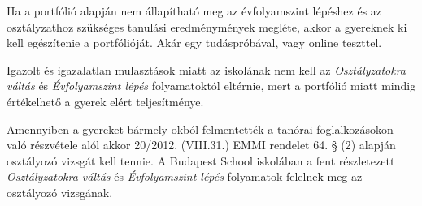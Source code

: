 Ha a portfólió alapján nem állapítható meg az évfolyamszint lépéshez és az
osztályzathoz
szükséges tanulási eredménymények megléte, akkor a gyereknek ki kell
egészítenie a portfólióját. Akár egy tudáspróbával, vagy online teszttel.

Igazolt és igazalatlan mulasztások miatt az iskolának nem kell az
\emph{Osztályzatokra váltás} és \emph{Évfolyamszint lépés} folyamatoktól
eltérnie, mert a portfólió miatt mindig értékelhető a gyerek elért
teljesítménye.

Amennyiben a gyereket bármely okból felmentették a tanórai foglalkozásokon való
részvétele alól akkor 20/2012.
(VIII.31.) EMMI rendelet 64. § (2)  alapján osztályozó
vizsgát kell tennie. A Budapest School iskolában a fent részletezett \emph{Osztályzatokra váltás} és \emph{Évfolyamszint
    lépés} folyamatok  felelnek meg az osztályozó vizsgának.
